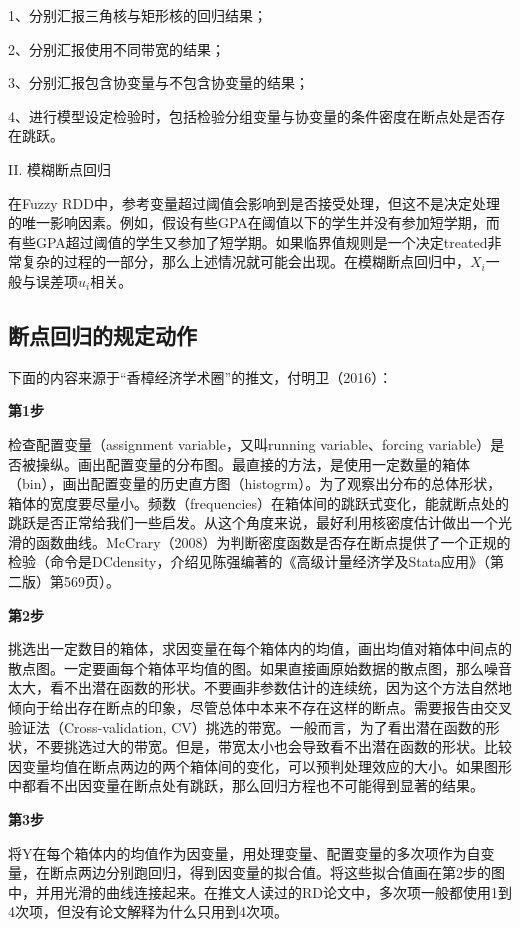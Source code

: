 \documentclass[cn,10pt,math=newtx,citestyle=gb7714-2015,bibstyle=gb7714-2015]{elegantbook}
\begin{document}
	1、分别汇报三角核与矩形核的回归结果；
	
	2、分别汇报使用不同带宽的结果；
	
	3、分别汇报包含协变量与不包含协变量的结果；
	
	4、进行模型设定检验时，包括检验分组变量与协变量的条件密度在断点处是否存在跳跃。
	
	
	II. 模糊断点回归
	
	在Fuzzy RDD中，参考变量超过阈值会影响到是否接受处理，但这不是决定处理的唯一影响因素。例如，假设有些GPA在阈值以下的学生并没有参加短学期，而有些GPA超过阈值的学生又参加了短学期。如果临界值规则是一个决定treated非常复杂的过程的一部分，那么上述情况就可能会出现。在模糊断点回归中，$X_i$一般与误差项$u_i$相关。
	
	\subsection{断点回归的规定动作}
	
	下面的内容来源于“香樟经济学术圈”的推文，付明卫（2016）：
	
	\textbf{第1步}
	
	检查配置变量（assignment variable，又叫running variable、forcing variable）是否被操纵。画出配置变量的分布图。最直接的方法，是使用一定数量的箱体（bin），画出配置变量的历史直方图（histogrm）。为了观察出分布的总体形状，箱体的宽度要尽量小。频数（frequencies）在箱体间的跳跃式变化，能就断点处的跳跃是否正常给我们一些启发。从这个角度来说，最好利用核密度估计做出一个光滑的函数曲线。McCrary（2008）为判断密度函数是否存在断点提供了一个正规的检验（命令是DCdensity，介绍见陈强编著的《高级计量经济学及Stata应用》（第二版）第569页）。
	
	\textbf{第2步}
	
	挑选出一定数目的箱体，求因变量在每个箱体内的均值，画出均值对箱体中间点的散点图。一定要画每个箱体平均值的图。如果直接画原始数据的散点图，那么噪音太大，看不出潜在函数的形状。不要画非参数估计的连续统，因为这个方法自然地倾向于给出存在断点的印象，尽管总体中本来不存在这样的断点。需要报告由交叉验证法（Cross-validation, CV）挑选的带宽。一般而言，为了看出潜在函数的形状，不要挑选过大的带宽。但是，带宽太小也会导致看不出潜在函数的形状。比较因变量均值在断点两边的两个箱体间的变化，可以预判处理效应的大小。如果图形中都看不出因变量在断点处有跳跃，那么回归方程也不可能得到显著的结果。
	
	\textbf{第3步}
	
	将Y在每个箱体内的均值作为因变量，用处理变量、配置变量的多次项作为自变量，在断点两边分别跑回归，得到因变量的拟合值。将这些拟合值画在第2步的图中，并用光滑的曲线连接起来。在推文人读过的RD论文中，多次项一般都使用1到4次项，但没有论文解释为什么只用到4次项。
	
\end{document}
